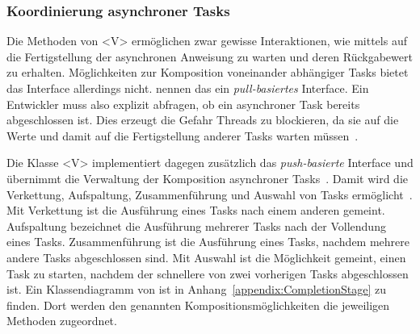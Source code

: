 \subsubsection{Koordinierung asynchroner Tasks}\label{sec:CompletableFuture}
Die Methoden von \classFuture<V>{} ermöglichen zwar gewisse Interaktionen, wie mittels  auf die Fertigstellung der asynchronen \gls{Anweisung} zu warten und deren Rückgabewert zu erhalten. Möglichkeiten zur Komposition voneinander abhängiger Tasks bietet das Interface allerdings nicht. \textcite[S.~240]{Hettel2016} nennen das ein \emph{pull-basiertes} Interface. Ein Entwickler muss also explizit abfragen, ob ein asynchroner Task bereits abgeschlossen ist. Dies erzeugt die Gefahr Threads zu blockieren, da sie auf die Werte und damit auf die Fertigstellung anderer Tasks warten müssen~\cite[S.~239]{Hettel2016}.

Die Klasse \classCompletableFuture<V>{} implementiert dagegen zusätzlich das \emph{push-basierte} Interface \classCompletionStage{} und übernimmt die Verwaltung der Komposition asynchroner Tasks~\cite[S.~240~ff.]{Hettel2016}. Damit wird die Verkettung, Aufspaltung, Zusammenführung und Auswahl von Tasks ermöglicht~\cite[S.~250~ff.]{Hettel2016}. Mit Verkettung ist die Ausführung eines Tasks nach einem anderen gemeint. Aufspaltung bezeichnet die Ausführung mehrerer Tasks nach der Vollendung eines Tasks. Zusammenführung ist die Ausführung eines Tasks, nachdem mehrere andere Tasks abgeschlossen sind. Mit Auswahl ist die Möglichkeit gemeint, einen Task zu starten, nachdem der schnellere von zwei vorherigen Tasks abgeschlossen ist. Ein Klassendiagramm von \classCompletionStage{} ist in Anhang~\ref{appendix:CompletionStage} zu finden. Dort werden den genannten Kompositionsmöglichkeiten die jeweiligen Methoden zugeordnet.